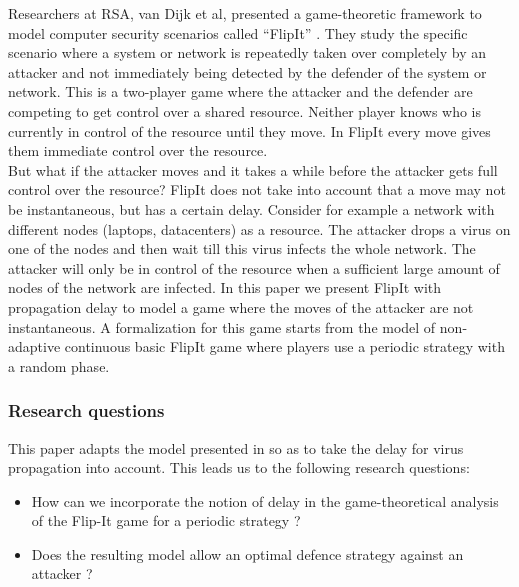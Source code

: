  Researchers at RSA, van Dijk et al,  presented a game-theoretic framework to model computer security scenarios called ``FlipIt'' \cite{FlipIt}. They study the specific scenario where a system or network is repeatedly taken over completely by an attacker and not immediately being detected by the defender of the system or network. This is a two-player game where the attacker and the defender are competing to get control over a shared resource. Neither player knows who is currently in control of the resource until they move. In FlipIt every move gives them immediate control over the resource. \\
 But what if the attacker moves and it takes a while before the attacker gets full control over the resource? FlipIt does not take into account that a move may not be instantaneous, but has a certain delay. Consider for example a network with different nodes (laptops, datacenters) as a resource. The attacker drops a virus on one of the nodes and then wait till this virus infects the whole network. The attacker will only be in control of the resource when a sufficient large amount of nodes of the network are infected. In this paper we present FlipIt with propagation delay to model a game where the moves of the attacker are not instantaneous. A formalization for this game starts from the model of non-adaptive continuous basic FlipIt game where players use a periodic strategy with a random phase.   \\

\subsubsection{Research questions}


This paper adapts the model presented in \cite{FlipIt} so as to take the delay for virus propagation into account.
This leads us to the following research questions:
\begin{itemize}
\item How can we incorporate the notion of delay in the game-theoretical analysis of the Flip-It game for a periodic strategy ?
\item Does the resulting model allow an optimal defence strategy against an attacker ? 
\end{itemize}


